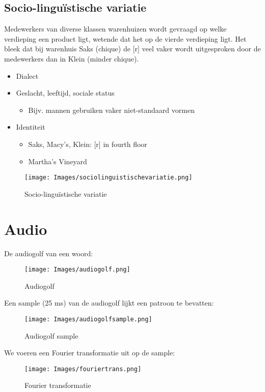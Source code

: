 {\subsection{Socio-linguïstische variatie}
Medewerkers van diverse klassen warenhuizen wordt gevraagd op welke verdieping een product ligt, wetende dat het op de vierde verdieping ligt. Het bleek dat bij warenhuis Saks (chique) de [r] veel vaker wordt uitgesproken door de medewerkers dan in Klein (minder chique).
\begin{itemize}
    \item Dialect
    \item Geslacht, leeftijd, sociale status
    \begin{itemize}
        \item Bijv. mannen gebruiken vaker niet-standaard vormen
    \end{itemize}
    \item Identiteit
    \begin{itemize}
        \item Saks, Macy's, Klein: [r] in fourth floor
        \item Martha's Vineyard
    \end{itemize}
\end{itemize}
\begin{figure}[h]
    \centering
    \texttt{[image: Images/sociolinguistischevariatie.png]}
    \caption{Socio-linguïstische variatie}
    \label{fig:sociolinguistisch}
\end{figure}
\section{Audio}
\noindent
De audiogolf van een woord:\\
\begin{figure}[h]
    \centering
    \texttt{[image: Images/audiogolf.png]}
    \caption{Audiogolf}
    \label{fig:audiogolf}
\end{figure}
\newpage
\noindent Een sample (25 ms) van de audiogolf lijkt een patroon te bevatten:\\
\begin{figure}[h]
    \centering
    \texttt{[image: Images/audiogolfsample.png]}
    \caption{Audiogolf sample}
    \label{fig:sample}
\end{figure}

\noindent We voeren een Fourier transformatie uit op de sample:\\
\begin{figure}[h]
    \centering
    \texttt{[image: Images/fouriertrans.png]}
    \caption{Fourier transformatie}
    \label{fig:fouriertrans}
\end{figure}

}

